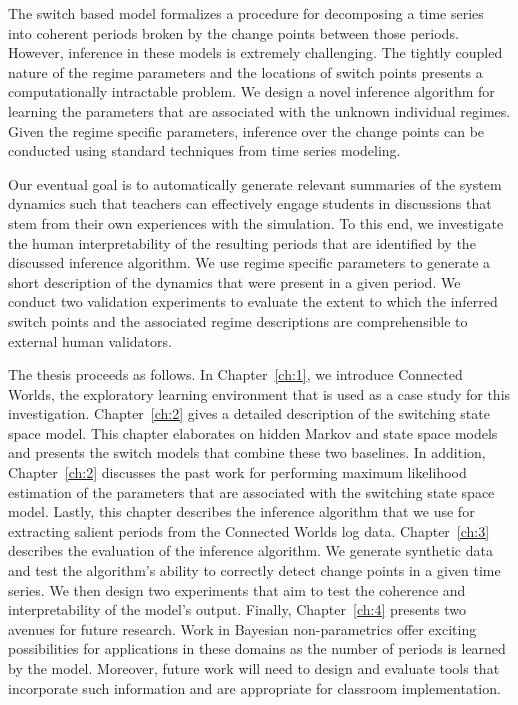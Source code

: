 The switch based model formalizes a procedure for decomposing a time series into coherent periods broken by the change points between those periods. However, inference in these models is extremely challenging. The tightly coupled nature of the regime parameters and the locations of switch points presents a computationally intractable problem. We design a novel inference algorithm for learning the parameters that are associated with the unknown individual regimes. Given the regime specific parameters, inference over the change points can be conducted using standard techniques from time series modeling.

Our eventual goal is to automatically generate relevant summaries of the system dynamics such that teachers can effectively engage students in discussions that stem from their own experiences with the simulation. To this end, we investigate the human interpretability of the resulting periods that are identified by the discussed inference algorithm. We use regime specific parameters to generate a short description of the dynamics that were present in a given period. We conduct two validation experiments to evaluate the extent to which the inferred switch points and the associated regime descriptions are comprehensible to external human validators.

The thesis proceeds as follows. In Chapter~\ref{ch:1}, we introduce Connected Worlds, the exploratory learning environment that is used as a case study for this investigation. Chapter~\ref{ch:2} gives a detailed description of the switching state space model. This chapter elaborates on hidden Markov and state space models and presents the switch models that combine these two baselines. In addition, Chapter~\ref{ch:2} discusses the past work for performing maximum likelihood estimation of the parameters that are associated with the switching state space model. Lastly, this chapter describes the inference algorithm that we use for extracting salient periods from the Connected Worlds log data. Chapter~\ref{ch:3} describes the evaluation of the inference algorithm. We generate synthetic data and test the algorithm's ability to correctly detect change points in a given time series. We then design two experiments that aim to test the coherence and interpretability of the model's output. Finally, Chapter~\ref{ch:4} presents two avenues for future research. Work in Bayesian non-parametrics offer exciting possibilities for applications in these domains as the number of periods is learned by the model. Moreover, future work will need to design and evaluate tools that incorporate such information and are appropriate for classroom implementation.


